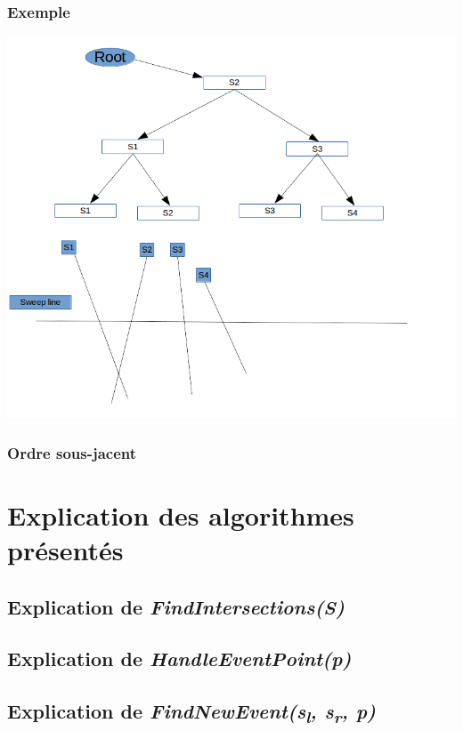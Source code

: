 \documentclass[]{article}
\begin{document}
        \subsubsection{Exemple}\label{subsub:TEx}
            \begin{center}
            \includegraphics[width=15cm]{ExempleTPng}
            \end{center}
        \subsubsection{Ordre sous-jacent}\label{subsub:TOrd}

\section{Explication des algorithmes présentés}\label{sec:algos}
    \subsection{Explication de \emph{FindIntersections(S)}}\label{sub:findInter}
    
    \subsection{Explication de \emph{HandleEventPoint(p)}}\label{sub:eventPoint}
    
    \subsection{Explication de \emph{FindNewEvent(s\textsubscript{l}, s\textsubscript{r}, p)}}\label{sub:findNew}
\end{document}

